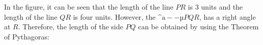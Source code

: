         \label{m39107*id66883}In the figure, it can be seen that the length of the line \begin{math}PR\end{math} is 3 units and the length of the line \begin{math}QR\end{math} is four units. However, the \begin{math}\mathrm{\^{a}--µ}PQR\end{math}, has a right angle at \begin{math}R\end{math}. Therefore, the length of the side \begin{math}PQ\end{math} can be obtained by using the Theorem of Pythagoras:\par 
        \label{m39107*id66950}\nopagebreak\noindent{}
